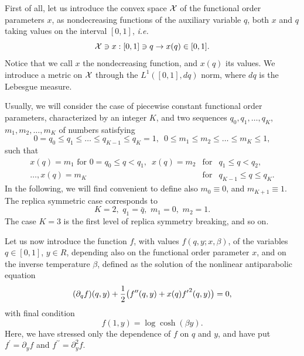 \documentclass[a4paper,12pt]{article}
\begin{document}
First of all, let us introduce the convex space ${\cal X}$ of the functional 
order parameters $x$, as nondecreasing functions of the auxiliary variable 
$q$,
both $x$ and $q$ taking
values on the interval $[0,1]$, {\it i.e.}
\begin{equation}
\label{x}
{\cal X}\ni x : [0,1]\ni q \rightarrow x(q) \in [0,1].
\end{equation}
Notice that we call $x$ the nondecreasing function, and $x(q)$ its values.
We introduce a metric on ${\cal X}$ through the $L^{1}([0,1], dq)$ norm, where 
$dq$ is the Lebesgue measure.

Usually, we will consider the case of piecewise constant functional order 
parameters, characterized by an integer $K$, and two sequences $q_0, q_1, 
\dots, q_K$, $m_1, m_2, \dots, m_K$ of numbers satisfying
\begin{equation}
\label{qm}
0=q_0\le q_1 \le \dots \le q_{K-1} \le q_K=1,\,\,\, 0\le m_1 \le m_2 \le \dots 
\le m_K \le 1,
\end{equation}
such that
\begin{eqnarray}
\nonumber
x(q)=m_1 \,\,\mbox{for}\,\, 0=q_0\le q < q_1,\,\,\, 
x(q)=m_2 &\mbox{for}& q_1\le q < q_2,\\
\label{xpcws}
\ldots,
 x(q)=m_K &\mbox{for}& q_{K-1}\le q \le q_K.
\end{eqnarray}
In the following, we will find convenient to define also $m_0\equiv 0$, 
and $m_{K+1}\equiv 1$. The replica symmetric case corresponds to 
\begin{equation}
\label{replicas}
K=2,\,\, 
q_1=\bar q, \,\, m_1=0,\,\, m_2=1.
\end{equation}
The case $K=3$ is the first level of 
replica symmetry breaking, and so on.

Let us now introduce the function $f$, with values $f(q,y;x,\beta)$, of 
the variables $q\in[0,1]$, $y\in R$, depending also on the functional order 
parameter $x$, and on the inverse temperature $\beta$, defined as the 
solution of the nonlinear antiparabolic equation 
\begin{equation}
\label{antipara}
(\partial_q f)(q,y)+
{1\over2}\bigl(f^{\prime\prime}(q,y)+x(q){f^\prime}^2(q,y)\bigr)=0,
\end{equation}
with final condition
\begin{equation}
\label{final}
f(1,y)=\log\cosh(\beta y).
\end{equation}
Here, we have stressed only the dependence of $f$ on $q$ and $y$, and have 
put $f^\prime=\partial_y f$ and $f^{\prime\prime}=\partial_y^2 f$.
\end{document}
